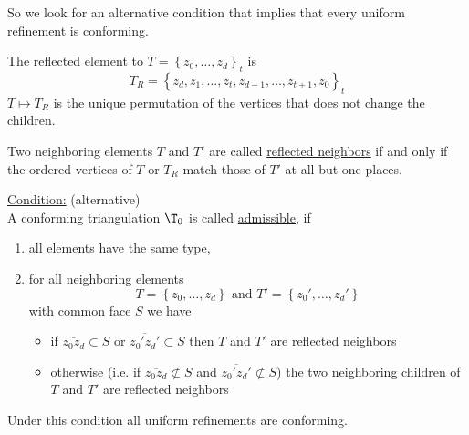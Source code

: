 So we look for an alternative condition that implies that every uniform refinement is conforming.
\begin{definition}
	The reflected element to $T= \left\{ z_{0},\dots ,z_{d} \right\}_{t}$ is
	\begin{equation*}
		T_{R}= \left\{ z_{d}, z_{1},\dots ,z_{t},z_{d-1},\dots ,z_{t+1},z_{0} \right\}_{t}
	\end{equation*}
	$T \mapsto T_{R}$ is the unique permutation of the vertices that does not change the children.
\end{definition}
\begin{definition}
	Two neighboring elements $T$ and $T'$ are called \underline{reflected neighbors} if and only if the ordered vertices of $T$ or $T_{R}$ match those of $T'$ at all but one places.
\end{definition}
\underline{Condition:} (alternative)\\
A conforming triangulation $\T_{0}$ is called \underline{admissible}, if
\begin{enumerate}[label = \arabic*)]
	\item all elements have the same type,
	\item for all neighboring elements 
		\begin{equation*}
			T = \left\{ z_{0},\dots ,z_{d} \right\} \text{ and } T' = \left\{ z_{0}',\dots ,z_{d}' \right\}
		\end{equation*}
		with common face $S$ we have 
		\begin{itemize}
			\item if  $\overline{z_{0}z_{d}}\subset  S$ or $\overline{z_{0}'z_{d}'}\subset S$ then $T$ and $T'$ are reflected neighbors
			\item otherwise (i.e. if $\overline{z_{0}z_{d}}\not\subset  S$ and $\overline{z_{0}'z_{d}'}\not\subset S$) the two neighboring children of $T$ and $T'$ are reflected neighbors
		\end{itemize}
	
\end{enumerate}
\begin{theorem}
	Under this condition all uniform refinements are conforming.
\end{theorem}
